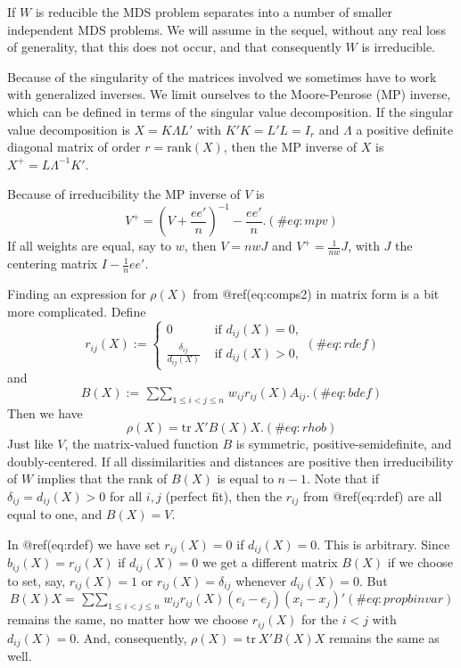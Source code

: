 \documentclass[
  12pt,
  letterpaper,
  DIV=11,
  numbers=noendperiod]{scrreprt}
\theoremstyle{remark}
\begin{document}
If \(W\) is reducible the MDS problem separates into a number of smaller
independent MDS problems. We will assume in the sequel, without any real
loss of generality, that this does not occur, and that consequently
\(W\) is irreducible.

Because of the singularity of the matrices involved we sometimes have to
work with generalized inverses. We limit ourselves to the Moore-Penrose
(MP) inverse, which can be defined in terms of the singular value
decomposition. If the singular value decomposition is \(X=K\Lambda L'\)
with \(K'K=L'L=I_r\) and \(\Lambda\) a positive definite diagonal matrix
of order \(r=\text{rank}(X)\), then the MP inverse of \(X\) is
\(X^+=L\Lambda^{-1}K'\).

Because of irreducibility the MP inverse of \(V\) is \begin{equation}
V^+=(V+\frac{ee'}{n})^{-1}-\frac{ee'}{n}.
(\#eq:mpv)
\end{equation} If all weights are equal, say to \(w\), then \(V=nwJ\)
and \(V^+=\frac{1}{nw}J\), with \(J\) the centering matrix
\(I-\frac{1}{n}ee'\).

Finding an expression for \(\rho(X)\) from @ref(eq:comps2) in matrix
form is a bit more complicated. Define \begin{equation}
r_{ij}(X):=\begin{cases}0&\text{ if }d_{ij}(X)=0,\\
\frac{\delta_{ij}}{d_{ij}(X)}&\text{ if }d_{ij}(X)>0,
\end{cases}
(\#eq:rdef)
\end{equation} and \begin{equation}
B(X):=\mathop{\sum\sum}_{1\leq i<j\leq n}w_{ij}r_{ij}(X)A_{ij}.
(\#eq:bdef)
\end{equation} Then we have \begin{equation}
\rho(X)=\text{tr}\ X'B(X)X.
(\#eq:rhob)
\end{equation} Just like \(V\), the matrix-valued function \(B\) is
symmetric, positive-semidefinite, and doubly-centered. If all
dissimilarities and distances are positive then irreducibility of \(W\)
implies that the rank of \(B(X)\) is equal to \(n-1\). Note that if
\(\delta_{ij}=d_{ij}(X)>0\) for all \(i,j\) (perfect fit), then the
\(r_{ij}\) from @ref(eq:rdef) are all equal to one, and \(B(X)=V\).

In @ref(eq:rdef) we have set \(r_{ij}(X)=0\) if \(d_{ij}(X)=0\). This is
arbitrary. Since \(b_{ij}(X)=r_{ij}(X)\) if \(d_{ij}(X)=0\) we get a
different matrix \(B(X)\) if we choose to set, say, \(r_{ij}(X)=1\) or
\(r_{ij}(X)=\delta_{ij}\) whenever \(d_{ij}(X)=0\). But \begin{equation}
B(X)X=\mathop{\sum\sum}_{1 \leq i<j\leq n}w_{ij}r_{ij}(X)(e_i-e_j)(x_i-x_j)'
(\#eq:propbinvar)
\end{equation} remains the same, no matter how we choose \(r_{ij}(X)\)
for the \(i<j\) with \(d_{ij}(X)=0\). And, consequently,
\(\rho(X)=\text{tr}\ X'B(X)X\) remains the same as well.
\end{document}
